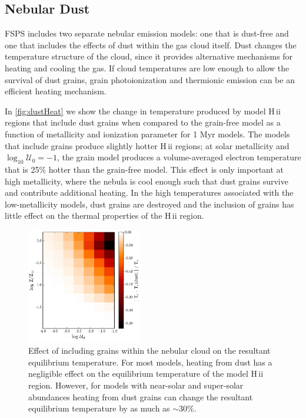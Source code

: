 \documentclass[twocolumn, tighten]{aastex61}
\newcommand{\Fig}[1]{\autoref{fig:#1}}
\newcommand{\FSPS}{{\sc FSPS}\xspace}
\newcommand{\logten}{\ensuremath{\log_{10}}}
\newcommand{\hii}{H\,{\sc ii}\xspace}
\newcommand{\logU}{\ensuremath{\logten \mathcal{U}_0}}
\begin{document}
\subsection{Nebular Dust}\label{sec:secondary:dust}

\FSPS includes two separate nebular emission models: one that is dust-free and one that includes the effects of dust within the gas cloud itself. Dust changes the temperature structure of the cloud, since it provides alternative mechanisms for heating and cooling the gas. If cloud temperatures are low enough to allow the survival of dust grains, grain photoionization and thermionic emission can be an efficient heating mechanism. 

In \Fig{dustHeat} we show the change in temperature produced by model \hii regions that include dust grains when compared to the grain-free model as a function of metallicity and ionization parameter for 1 Myr models. The models that include grains produce slightly hotter \hii regions; at solar metallicity and $\logU = -1$, the grain model produces a volume-averaged electron temperature that is 25\% hotter than the grain-free model. This effect is only important at high metallicity, where the nebula is cool enough such that dust grains survive and contribute additional heating. In the high temperatures associated with the low-metallicity models, dust grains are destroyed and the inclusion of grains has little effect on the thermal properties of the \hii region. 

\begin{figure}
  \begin{centering}
    \includegraphics[width=0.45\textwidth]{f28.pdf}
    \caption{Effect of including grains within the nebular cloud on the resultant equilibrium temperature. For most models, heating from dust has a negligible effect on the equilibrium temperature of the model \hii region. However, for models with near-solar and super-solar abundances heating from dust grains can change the resultant equilibrium temperature by as much as ${\sim}30\%$.}
    \label{fig:dustHeat}
  \end{centering}
\end{figure}
\end{document}
